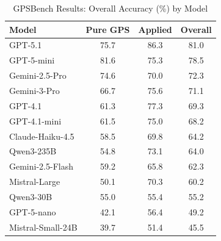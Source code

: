 \begin{table}[t]
\centering
\caption{GPSBench Results: Overall Accuracy (\%) by Model}
\label{tab:main_results}
\begin{tabular}{lccc}
\toprule
Model & Pure GPS & Applied & Overall \\
\midrule
GPT-5.1 & 75.7 & 86.3 & 81.0 \\
GPT-5-mini & 81.6 & 75.3 & 78.5 \\
Gemini-2.5-Pro & 74.6 & 70.0 & 72.3 \\
Gemini-3-Pro & 66.7 & 75.6 & 71.1 \\
GPT-4.1 & 61.3 & 77.3 & 69.3 \\
GPT-4.1-mini & 61.5 & 75.0 & 68.2 \\
Claude-Haiku-4.5 & 58.5 & 69.8 & 64.2 \\
Qwen3-235B & 54.8 & 73.1 & 64.0 \\
Gemini-2.5-Flash & 59.2 & 65.8 & 62.3 \\
Mistral-Large & 50.1 & 70.3 & 60.2 \\
Qwen3-30B & 55.0 & 55.4 & 55.2 \\
GPT-5-nano & 42.1 & 56.4 & 49.2 \\
Mistral-Small-24B & 39.7 & 51.4 & 45.5 \\
\bottomrule
\end{tabular}
\end{table}